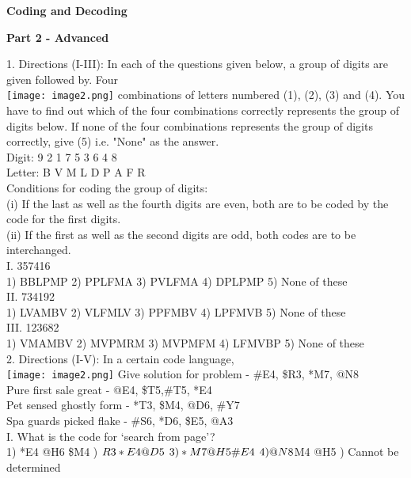 \documentclass[
]{article}
\author{}
\date{}
\begin{document}
	
 

\begin{center}
	{\Large \textbf{Coding and Decoding \\}}
\end{center}

{\large \textbf{Part 2 - Advanced  \\}}

1. Directions (I-III): In each of the questions given below, a group of digits are given followed by. Four \\
\texttt{[image: image2.png]} combinations of letters numbered (1), (2), (3) and (4). You have to find out which of
the four combinations correctly represents the group of digits below. If none of the four
combinations represents the group of digits correctly, give (5) i.e. "None" as the answer. \\
Digit: 9 2 1 7 5 3 6 4 8\\
Letter: B V M L D P A F R\\
Conditions for coding the group of digits: \\
(i) If the last as well as the fourth digits are even, both are to be coded by the code for the
first digits.\\
(ii) If the first as well as the second digits are odd, both codes are to be interchanged.\\

I. 357416\\
1) BBLPMP 2) PPLFMA 3) PVLFMA 4) DPLPMP 5) None of these\\

II. 734192\\
1) LVAMBV 2) VLFMLV 3) PPFMBV 4) LPFMVB 5) None of these\\

III. 123682\\
1) VMAMBV 2) MVPMRM 3) MVPMFM 4) LFMVBP 5) None of these\\

2. Directions (I-V): In a certain code language,\\
\texttt{[image: image2.png]}
Give solution for problem - \#E4, \$R3, *M7, @N8\\
Pure first sale great - @E4, \$T5,\#T5, *E4\\
Pet sensed ghostly form - *T3, \$M4, @D6, \#Y7\\
Spa guards picked flake - \#S6, *D6, \$E5, @A3\\

I. What is the code for ‘search from page’?\\
1) *E4 @H6 \$M4 ) $R3  *E4  @D5 \hspace{1.5mm} 3) *M7 @H5 \#E4 \hspace{1.5mm} 4) @N8 $M4 @H5 ) Cannot be determined
\end{document}
